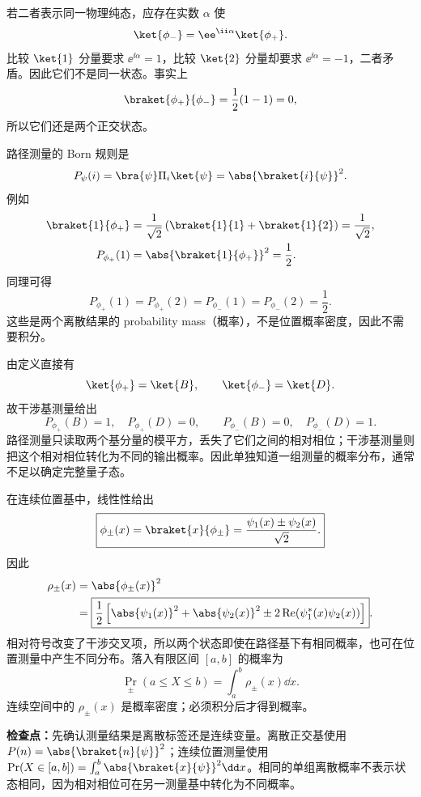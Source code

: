 \begin{checkedsolution}
若二者表示同一物理纯态，应存在实数 $\alpha$ 使
\[
  \ket{\phi_-}=\ee^{\ii\alpha}\ket{\phi_+}.
\]
比较 $\ket{1}$ 分量要求 $\ee^{\ii\alpha}=1$，比较 $\ket{2}$ 分量却要求 $\ee^{\ii\alpha}=-1$，二者矛盾。因此它们不是同一状态。事实上
\begin{equation}
  \braket{\phi_+}{\phi_-}
  =\frac12(1-1)=0,
  \label{eq:QM-C03-S05-E01-orthogonal-states}
\end{equation}
所以它们还是两个正交状态。

路径测量的 Born 规则是
\[
  P_\psi(i)
  =\bra{\psi}\Pi_i\ket{\psi}
  =\abs{\braket{i}{\psi}}^2.
\]
例如
\begin{align}
  \braket{1}{\phi_+}
  &=\frac1{\sqrt2}
    \left(\braket{1}{1}+\braket{1}{2}\right)
    =\frac1{\sqrt2},
  \notag\\
  P_{\phi_+}(1)
  &=\abs{\braket{1}{\phi_+}}^2
    =\frac12.
  \label{eq:QM-C03-S05-E01-discrete-probability}
\end{align}
同理可得
\begin{equation}
  \boxed{
  P_{\phi_+}(1)=P_{\phi_+}(2)
  =P_{\phi_-}(1)=P_{\phi_-}(2)=\frac12.}
  \label{eq:QM-C03-S05-E01-path-statistics}
\end{equation}
这些是两个离散结果的 probability mass（概率），不是位置概率密度，因此不需要积分。

由定义直接有
\[
  \ket{\phi_+}=\ket{B},
  \qquad
  \ket{\phi_-}=\ket{D}.
\]
故干涉基测量给出
\begin{equation}
  \boxed{
  P_{\phi_+}(B)=1,\quad P_{\phi_+}(D)=0,
  \qquad
  P_{\phi_-}(B)=0,\quad P_{\phi_-}(D)=1.}
  \label{eq:QM-C03-S05-E01-interference-statistics}
\end{equation}
路径测量只读取两个基分量的模平方，丢失了它们之间的相对相位；干涉基测量则把这个相对相位转化为不同的输出概率。因此单独知道一组测量的概率分布，通常不足以确定完整量子态。

在连续位置基中，线性性给出
\begin{equation}
  \boxed{
  \phi_\pm(x)
  =\braket{x}{\phi_\pm}
  =\frac{\psi_1(x)\pm\psi_2(x)}{\sqrt2}.}
  \label{eq:QM-C03-S05-E01-position-amplitudes}
\end{equation}
因此
\begin{align}
  \rho_\pm(x)
  &=\abs{\phi_\pm(x)}^2 \notag\\
  &=\boxed{
    \frac12\left[
      \abs{\psi_1(x)}^2+\abs{\psi_2(x)}^2
      \pm2\operatorname{Re}\!\left(\psi_1^*(x)\psi_2(x)\right)
    \right]}.
  \label{eq:QM-C03-S05-E01-position-densities}
\end{align}
相对符号改变了干涉交叉项，所以两个状态即使在路径基下有相同概率，也可在位置测量中产生不同分布。落入有限区间 $[a,b]$ 的概率为
\begin{equation}
  \boxed{
  \Pr_\pm(a\leq X\leq b)
  =\int_a^b\rho_\pm(x)\dd x.}
  \label{eq:QM-C03-S05-E01-interval-probability}
\end{equation}
连续空间中的 $\rho_\pm(x)$ 是概率密度；必须积分后才得到概率。
\end{checkedsolution}

\textbf{检查点：}先确认测量结果是离散标签还是连续变量。离散正交基使用 $P(n)=\abs{\braket{n}{\psi}}^2$；连续位置测量使用 $\Pr(X\in[a,b])=\int_a^b\abs{\braket{x}{\psi}}^2\dd x$。相同的单组离散概率不表示状态相同，因为相对相位可在另一测量基中转化为不同概率。
